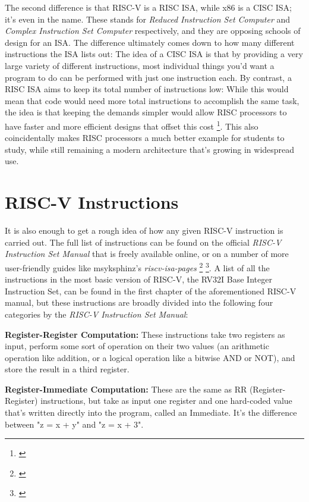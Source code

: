 \documentclass[12pt,twoside]{reedthesis}
\begin{document}
The second difference is that RISC-V is a RISC ISA, while x86 is a CISC ISA; it's even in the name. These stands for \textit{Reduced Instruction Set Computer} and \textit{Complex Instruction Set Computer} respectively, and they are opposing schools of design for an ISA. The difference ultimately comes down to how many different instructions the ISA lists out: The idea of a CISC ISA is that by providing a very large variety of different instructions, most individual things you'd want a program to do can be performed with just one instruction each. By contrast, a RISC ISA aims to keep its total number of instructions low: While this would mean that code would need more total instructions to accomplish the same task, the idea is that keeping the demands simpler would allow RISC processors to have faster and more efficient designs that offset this cost \footnote{\cite{denning}}. This also coincidentally makes RISC processors a much better example for students to study, while still remaining a modern architecture that's growing in widespread use.


\section{RISC-V Instructions}

It is also enough to get a rough idea of how any given RISC-V instruction is carried out. The full list of instructions can be found on the official \textit{RISC-V Instruction Set Manual} that is freely available online, or on a number of more user-friendly guides like msyksphinz's \textit{riscv-isa-pages} \footnote{\cite{waterman}} \footnote{\cite{msyksphinz}}. A list of all the instructions in the most basic version of RISC-V, the RV32I Base Integer Instruction Set, can be found in the first chapter of the aforementioned RISC-V manual, but these instructions are broadly divided into the following four categories by the \textit{RISC-V Instruction Set Manual}:


\textbf{Register-Register Computation:} These instructions take two registers as input, perform some sort of operation on their two values (an arithmetic operation like addition, or a logical operation like a bitwise AND or NOT), and store the result in a third register.

\textbf{Register-Immediate Computation:} These are the same as RR (Register-Register) instructions, but take as input one register and one hard-coded value that's written directly into the program, called an Immediate. It's the difference between "z = x + y" and "z = x + 3".
\end{document}
